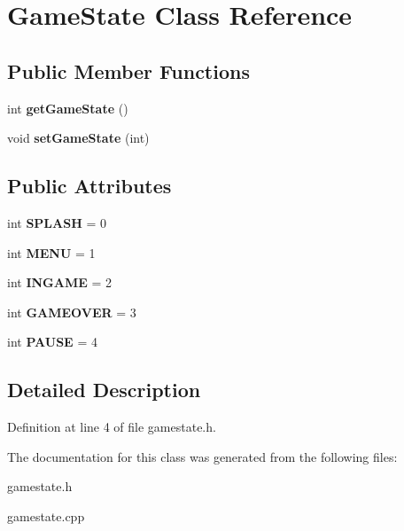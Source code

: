 \hypertarget{classGameState}{}\section{Game\+State Class Reference}
\label{classGameState}
\subsection*{Public Member Functions}
\begin{DoxyCompactItemize}
\item 
int {\bfseries get\+Game\+State} ()\hypertarget{classGameState_af20f310030244f07204b2e53b364332e}{}\label{classGameState_af20f310030244f07204b2e53b364332e}

\item 
void {\bfseries set\+Game\+State} (int)\hypertarget{classGameState_abb0ab40349a3094465a74643eb731e22}{}\label{classGameState_abb0ab40349a3094465a74643eb731e22}

\end{DoxyCompactItemize}
\subsection*{Public Attributes}
\begin{DoxyCompactItemize}
\item 
int {\bfseries S\+P\+L\+A\+SH} = 0\hypertarget{classGameState_ade9e04b33f1dea1d62358a4f63b9a509}{}\label{classGameState_ade9e04b33f1dea1d62358a4f63b9a509}

\item 
int {\bfseries M\+E\+NU} = 1\hypertarget{classGameState_abd9f3d7cdc22931db952cc17010752a1}{}\label{classGameState_abd9f3d7cdc22931db952cc17010752a1}

\item 
int {\bfseries I\+N\+G\+A\+ME} = 2\hypertarget{classGameState_aae6641ae96366549f729c136cdcc5c5c}{}\label{classGameState_aae6641ae96366549f729c136cdcc5c5c}

\item 
int {\bfseries G\+A\+M\+E\+O\+V\+ER} = 3\hypertarget{classGameState_a994c426ab97d2c6e186c13fd357ccc68}{}\label{classGameState_a994c426ab97d2c6e186c13fd357ccc68}

\item 
int {\bfseries P\+A\+U\+SE} = 4\hypertarget{classGameState_a1353d084bf0c63bd879656de599db4b5}{}\label{classGameState_a1353d084bf0c63bd879656de599db4b5}

\end{DoxyCompactItemize}


\subsection{Detailed Description}


Definition at line 4 of file gamestate.\+h.



The documentation for this class was generated from the following files\+:\begin{DoxyCompactItemize}
\item 
gamestate.\+h\item 
gamestate.\+cpp\end{DoxyCompactItemize}
